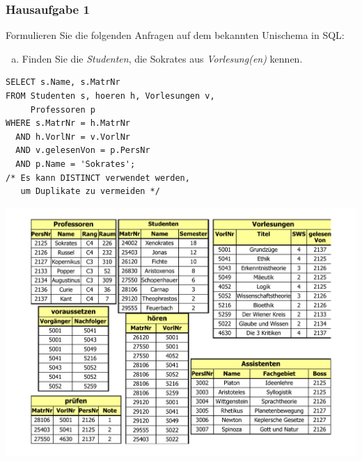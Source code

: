\begin{frame}[fragile]
	\frametitle{Hausaufgabe 1}
	\vspace{0.25cm}

	\begin{multicols}{2}
		Formulieren Sie die folgenden Anfragen auf dem bekannten Unischema in SQL:
		\begin{enumerate}[a)]
			\item Finden Sie die \textit{Studenten}, die Sokrates aus \textit{Vorlesung(en)} kennen.
		\end{enumerate}

		\begin{verbatim}
SELECT s.Name, s.MatrNr
FROM Studenten s, hoeren h, Vorlesungen v, 
     Professoren p
WHERE s.MatrNr = h.MatrNr
  AND h.VorlNr = v.VorlNr
  AND v.gelesenVon = p.PersNr
  AND p.Name = 'Sokrates';
/* Es kann DISTINCT verwendet werden, 
   um Duplikate zu vermeiden */
		\end{verbatim}
		\vfill\columnbreak

		\begin{center}
			\includegraphics[height=.6\paperheight]{../img/uni.pdf}
		\end{center}
	\end{multicols}
\end{frame}

